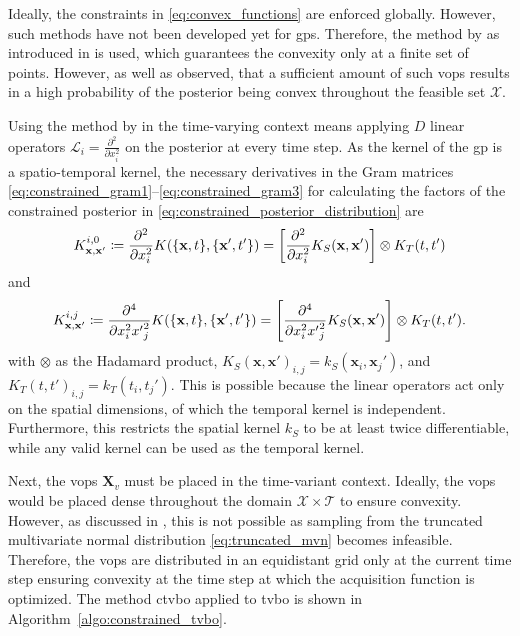 Ideally, the constraints in \eqref{eq:convex_functions} are enforced globally. However, such methods have not been developed yet for \glspl{gp}. Therefore, the method by \textcite{Agrell_2019} as introduced in  is used, which guarantees the convexity only at a finite set of points. However, \textcite{Wang_2016} as well as \textcite{Agrell_2019} observed, that a sufficient amount of such \glspl{vop} results in a high probability of the posterior being convex throughout the feasible set $\mathcal{X}$.

Using the method by \textcite{Agrell_2019} in the time-varying context means applying $D$ linear operators $\mathcal{L}_i = \frac{\partial^2}{\partial x_i^2}$ on the posterior at every time step. As the kernel of the \gls{gp} is a spatio-temporal kernel, the necessary derivatives in the Gram matrices \eqref{eq:constrained_gram1}--\eqref{eq:constrained_gram3} for calculating the factors of the constrained posterior in \eqref{eq:constrained_posterior_distribution} are
\begin{equation}
    K^{i,0}_{\mathbf{x},\mathbf{x}'} \coloneqq \frac{\partial^2}{\partial x_i^2}K(\{\mathbf{x},t\},\{\mathbf{x}',t'\}) = \left[\frac{\partial^2}{\partial x_i^2}K_S(\mathbf{x},\mathbf{x}')\right] \otimes K_T(t,t')
    \label{eq:single_deriv}
\end{equation}
and 
\begin{equation}
    K^{i,j}_{\mathbf{x},\mathbf{x}'} \coloneqq \frac{\partial^4}{\partial x_i^2 {x'}_j^2}K(\{\mathbf{x},t\},\{\mathbf{x}',t'\}) = \left[\frac{\partial^4}{\partial x_i^2 {x'}_j^2}K_S(\mathbf{x},\mathbf{x}')\right] \otimes K_T(t,t').
    \label{eq:double_deriv}
\end{equation}
with $\otimes$ as the Hadamard product, $K_S(\mathbf{x},\mathbf{x}')_{i,j}=k_S(\mathbf{x}_i,\mathbf{x}_j')$, and $K_T(t,t')_{i,j}=k_T(t_i,t_j')$.
This is possible because the linear operators act only on the spatial dimensions, of which the temporal kernel is independent. Furthermore, this restricts the spatial kernel $k_S$ to be at least twice differentiable, while any valid kernel can be used as the temporal kernel.

Next, the \glspl{vop} $\mathbf{X}_v$ must be placed in the time-variant context. Ideally, the \glspl{vop} would be placed dense throughout the domain $\mathcal{X}\times\mathcal{T}$ to ensure convexity. However, as discussed in , this is not possible as sampling from the truncated multivariate normal distribution \eqref{eq:truncated_mvn} becomes infeasible. Therefore, the \glspl{vop} are distributed in an equidistant grid only at the current time step ensuring convexity at the time step at which the acquisition function is optimized. The method \gls{ctvbo} applied to \gls{tvbo} is shown in Algorithm~\ref{algo:constrained_tvbo}.

